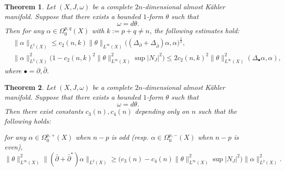 \documentclass[10pt,a4paper]{amsart}
\newtheorem{theorem}{Theorem}
\def \De {\Delta}
\def\Om{\Omega}
\def \a {\alpha }
\def\pa{\partial}
\def\w {\omega}
\begin{document}
	\begin{theorem}\label{Thm6}
	Let $(X,J,\w)$ be a complete $2n$-dimensional almost K\"{a}hler manifold. Suppose that there exists a bounded $1$-form $\theta$ such that
	\[\w=d\theta.\]
	Then for any $\a\in\Om^{p,q}_{0}(X)$ with $k:=p+q\neq n$, the following estimates hold:
	\begin{equation*}
	\begin{split}
	&\|\a\|_{L^{2}(X)}\leq c_2(n,k)\|\theta\|_{L^{\infty}(X)}\Big((\De_{\pa}+\De_{\bar{\pa}})\a,\a\Big)^{\frac{1}{2}},\\
	&\|\a\|_{L^{2}(X)}^{2}\Big(1-c_2(n,k)^{2}\|\theta\|^{2}_{L^{\infty}(X)}\sup|N_{J}|^{2}\Big)
	\leq 2c_2(n,k)^{2}\|\theta\|^{2}_{L^{\infty}(X)}(\De_{\bullet}\a,\a),
	\end{split}
	\end{equation*}
	where $\bullet=\pa,\bar{\pa}$. 
\end{theorem}	

\begin{theorem}\label{Thm3}
	Let $(X,J,\w)$ be a complete $2n$-dimensional almost K\"{a}hler manifold. Suppose that there exists a bounded $1$-form $\theta$ such that
	\[ \w=d\theta.\]
	Then there exist constants $c_{3}(n),c_{4}(n)$ depending only on $n$ such that the following holds: 
	
	for any $\a\in\Om_{0}^{p,+}(X)$ when $n-p$ is odd (resp. $\a\in\Om_{0}^{p,-}(X)$ when $n-p$ is even), 
	\[\|\theta\|^{2}_{L^{\infty}(X)}\|(\bar{\partial}+\bar{\partial}^{\ast})\a\|_{L^{2}(X)}
	\geq \Big(c_{3}(n)-c_{4}(n)\|\theta\|^{2}_{L^{\infty}(X)}\sup|N_{J}|^{2}\Big)\|\a\|^{2}_{L^{2}(X)}. \]
\end{theorem}
\end{document}
